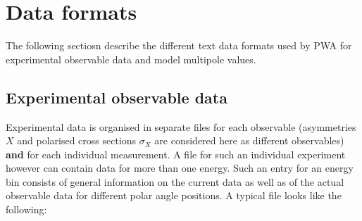 \documentclass[a4paper,10pt]{article}
\begin{document}
\section{Data formats}

The following sectiosn describe the different text data formats used by PWA for experimental observable data and model multipole values. 

\subsection{Experimental observable data}

Experimental data is organised in separate files for each observable (asymmetries $X$ and polarised cross sections $\sigma_X$
are considered here as different observables) \textbf{and} for each individual measurement. A file for such an individual experiment
however can contain data for more than one energy.
Such an entry for an energy bin consists of general information on the current data as well as of the actual observable data
for different polar angle positions. A typical file looks like the following:\\
\end{document}
